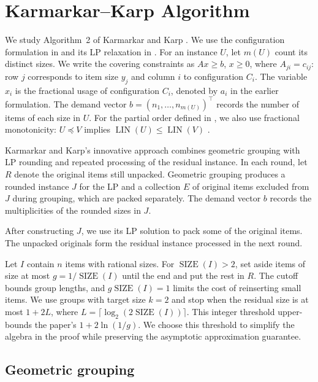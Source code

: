\documentclass[11pt,a4paper,onecolumn]{article}
\theoremstyle{plain}
\theoremstyle{definition}
\theoremstyle{remark}
\DeclareMathOperator{\SIZE}{SIZE}
\DeclareMathOperator{\LIN}{LIN}
\begin{document}
\section{Karmarkar--Karp Algorithm}
\label{sec:kk}

We study Algorithm~2 of Karmarkar and Karp
\cite[Theorem~4]{karmarkarEfficientApproximationScheme1982}.
We use the configuration formulation in 
and its LP relaxation in .
For an instance $U$, let $m(U)$ count its distinct sizes. We write
the covering constraints as $Ax\ge b$, $x\ge0$, where
$A_{ji}=c_{ij}$: row $j$ corresponds to item size $y_j$ and column
$i$ to configuration $C_i$. The variable $x_i$ is the fractional
usage of configuration $C_i$, denoted by $a_i$ in the earlier
formulation. The demand vector $b=(n_1,\ldots,n_{m(U)})^\top$
records the number of items of each size in $U$.
For the partial order defined in ,
we also use fractional monotonicity:
$U\preceq V$ implies $\LIN(U)\le\LIN(V)$
\cite[Section~4]{karmarkarEfficientApproximationScheme1982}.

Karmarkar and Karp's innovative approach combines geometric grouping
with LP rounding and repeated processing of the residual instance.
In each round, let
$R$ denote the original items still unpacked. Geometric grouping produces
a rounded instance $J$ for the LP and a collection $E$ of original items
excluded from $J$ during grouping, which are packed separately.
The demand vector $b$ records the multiplicities of the rounded sizes
in $J$.

After constructing $J$, we use its LP solution to pack some of the
original items. The unpacked originals form the residual instance
processed in the next round.

Let $I$ contain $n$ items with rational sizes.
For $\SIZE(I)>2$, set aside items of size at most
$g=1/\SIZE(I)$ until the end and put the rest in $R$. The cutoff bounds
group lengths, and $g\SIZE(I)=1$ limits the cost of reinserting small items.
We use groups with target size $k=2$ and stop
when the residual size is at most $1+2L$, where
$L=\lceil\log_2(2\SIZE(I))\rceil$. This integer threshold upper-bounds
the paper's $1+2\ln(1/g)$. We choose this threshold to simplify
the algebra in the proof while preserving the asymptotic approximation
guarantee.

\subsection{Geometric grouping}
\end{document}
